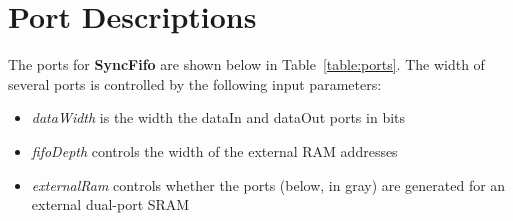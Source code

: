 \section{Port Descriptions}

The ports for \textbf{SyncFifo} are shown below in
Table~\ref{table:ports}. The width of several ports is controlled
by the following input parameters:

\begin{itemize}[noitemsep]
  \item \textit{dataWidth} is the width the dataIn and dataOut ports in bits
  \item \textit{fifoDepth} controls the width of the external RAM addresses
  \item \textit{externalRam} controls whether the ports (below, in gray) are
        generated for an external dual-port SRAM
\end{itemize}

